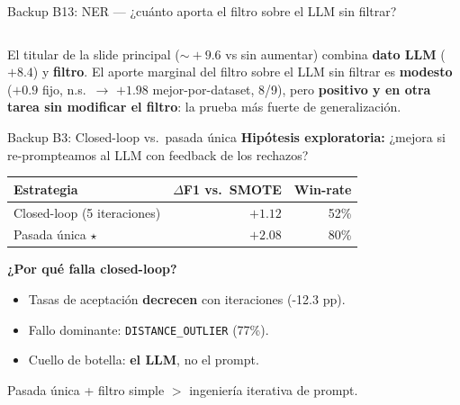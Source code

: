 \begin{frame}{Backup B13: NER --- ¿cuánto aporta el filtro sobre el LLM sin filtrar?}
\begin{columns}[T]
\end{columns}

\begin{insight}
\scriptsize El titular de la slide principal ($\sim\!+9.6$ vs sin aumentar) combina \textbf{dato LLM} ($+8.4$) y \textbf{filtro}. El aporte marginal del filtro sobre el LLM sin filtrar es \textbf{modesto} ($+0.9$ fijo, n.s.\ $\to$ $+1.98$ mejor-por-dataset, 8/9), pero \textbf{positivo y en otra tarea sin modificar el filtro}: la prueba más fuerte de generalización.
\end{insight}
\end{frame}


\begin{frame}{Backup B3: Closed-loop vs.\ pasada única}
\small
\textbf{Hipótesis exploratoria:} ¿mejora si re-prompteamos al LLM con feedback de los rechazos?

\vspace{0.5em}
\begin{tabular}{@{}lrr@{}}
\toprule
Estrategia                          & $\Delta$F1 vs.\ SMOTE & Win-rate \\
\midrule
Closed-loop (5 iteraciones)         & $+1{.}12$             & 52\% \\
Pasada única \alert{$\star$}        & $+2{.}08$             & 80\% \\
\bottomrule
\end{tabular}

\vspace{0.6em}
\textbf{¿Por qué falla closed-loop?}
\begin{itemize}\setlength\itemsep{0pt}
  \item Tasas de aceptación \textbf{decrecen} con iteraciones (-12.3 pp).
  \item Fallo dominante: \texttt{DISTANCE\_OUTLIER} (77\%).
  \item Cuello de botella: \textbf{el LLM}, no el prompt.
\end{itemize}

\vspace{0.4em}
\begin{insight}
\scriptsize Pasada única + filtro simple $>$ ingeniería iterativa de prompt.
\end{insight}
\end{frame}

